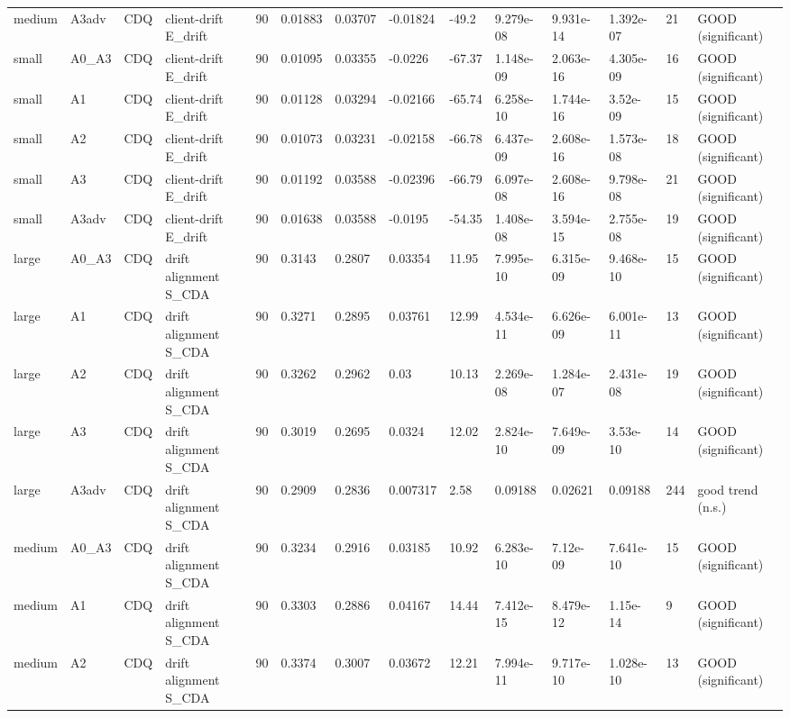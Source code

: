 \begin{table}[t]
\begin{tabular}{llllllllllllll}
medium & A3adv & CDQ & client-drift E\_drift & 90 & 0.01883 & 0.03707 & -0.01824 & -49.2 & 9.279e-08 & 9.931e-14 & 1.392e-07 & 21 & GOOD (significant) \\
small & A0\_A3 & CDQ & client-drift E\_drift & 90 & 0.01095 & 0.03355 & -0.0226 & -67.37 & 1.148e-09 & 2.063e-16 & 4.305e-09 & 16 & GOOD (significant) \\
small & A1 & CDQ & client-drift E\_drift & 90 & 0.01128 & 0.03294 & -0.02166 & -65.74 & 6.258e-10 & 1.744e-16 & 3.52e-09 & 15 & GOOD (significant) \\
small & A2 & CDQ & client-drift E\_drift & 90 & 0.01073 & 0.03231 & -0.02158 & -66.78 & 6.437e-09 & 2.608e-16 & 1.573e-08 & 18 & GOOD (significant) \\
small & A3 & CDQ & client-drift E\_drift & 90 & 0.01192 & 0.03588 & -0.02396 & -66.79 & 6.097e-08 & 2.608e-16 & 9.798e-08 & 21 & GOOD (significant) \\
small & A3adv & CDQ & client-drift E\_drift & 90 & 0.01638 & 0.03588 & -0.0195 & -54.35 & 1.408e-08 & 3.594e-15 & 2.755e-08 & 19 & GOOD (significant) \\
large & A0\_A3 & CDQ & drift alignment S\_CDA & 90 & 0.3143 & 0.2807 & 0.03354 & 11.95 & 7.995e-10 & 6.315e-09 & 9.468e-10 & 15 & GOOD (significant) \\
large & A1 & CDQ & drift alignment S\_CDA & 90 & 0.3271 & 0.2895 & 0.03761 & 12.99 & 4.534e-11 & 6.626e-09 & 6.001e-11 & 13 & GOOD (significant) \\
large & A2 & CDQ & drift alignment S\_CDA & 90 & 0.3262 & 0.2962 & 0.03 & 10.13 & 2.269e-08 & 1.284e-07 & 2.431e-08 & 19 & GOOD (significant) \\
large & A3 & CDQ & drift alignment S\_CDA & 90 & 0.3019 & 0.2695 & 0.0324 & 12.02 & 2.824e-10 & 7.649e-09 & 3.53e-10 & 14 & GOOD (significant) \\
large & A3adv & CDQ & drift alignment S\_CDA & 90 & 0.2909 & 0.2836 & 0.007317 & 2.58 & 0.09188 & 0.02621 & 0.09188 & 244 & good trend (n.s.) \\
medium & A0\_A3 & CDQ & drift alignment S\_CDA & 90 & 0.3234 & 0.2916 & 0.03185 & 10.92 & 6.283e-10 & 7.12e-09 & 7.641e-10 & 15 & GOOD (significant) \\
medium & A1 & CDQ & drift alignment S\_CDA & 90 & 0.3303 & 0.2886 & 0.04167 & 14.44 & 7.412e-15 & 8.479e-12 & 1.15e-14 & 9 & GOOD (significant) \\
medium & A2 & CDQ & drift alignment S\_CDA & 90 & 0.3374 & 0.3007 & 0.03672 & 12.21 & 7.994e-11 & 9.717e-10 & 1.028e-10 & 13 & GOOD (significant) \\

\end{tabular}
\end{table}
